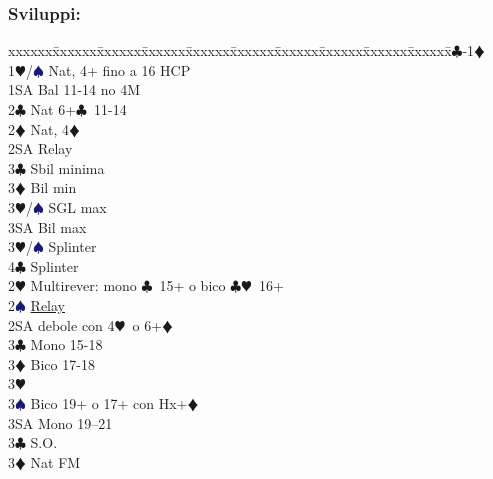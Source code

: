 \documentclass[a4paper,italian]{article}
\newcommand{\BC}{\textcolor{OliveGreen}{$\clubsuit$}}
\newcommand{\BD}{\textcolor{RedOrange}{$\vardiamondsuit$}}
\newcommand{\BH}{\textcolor{Red2}{$\varheartsuit${}}}
\newcommand{\BS}{\textcolor{MidnightBlue}{$\spadesuit${}}}
\newenvironment{bidtable}
{\begin{tabbing}

    xxxxxx\=xxxxxx\=xxxxxx\=xxxxxx\=xxxxxx\=xxxxxx\=xxxxxx\=xxxxxx\=xxxxxx\=xxxxxx\=\kill}
{\end{tabbing} }%
\begin{document}
\begin{multicols}{2}
                                    \subsubsection{Sviluppi:}
                                    \begin{bidtable}
                                        1\BC-1\BD\+\\
                                        1\BH/\BS \> Nat, 4+ fino a 16 HCP\\
                                        1SA \> Bal 11-14 no 4M\\
                                        2\BC \> Nat 6+\BC\ 11-14\\
                                        2\BD \> Nat, 4\BD \+\\
                                        2SA \> Relay\+\\
                                        3\BC \> Sbil minima\\
                                        3\BD \> Bil min\\
                                        3\BH/\BS \> SGL max\\
                                        3SA \> Bil max\-\\
                                        3\BH/\BS \> Splinter\\
                                        4\BC \> Splinter\-\\
                                        2\BH \> Multirever: mono \BC\ 15+ o bico \BC \BH\ 16+\+\\
                                        2\BS \> \hyperref[multirever]{Relay}\\
                                        2SA \> debole con 4\BH\ o 6+\BD \+\\
                                        3\BC \> Mono 15-18\\
                                        3\BD \> Bico 17-18\\
                                        3\BH {}\\
                                        3\BS \> Bico 19+ o 17+ con Hx+\BD\\
                                        3SA \> Mono 19--21\-\\
                                        3\BC \> S.O.\\
                                        3\BD \> Nat FM\\

\end{bidtable}
\end{multicols}
\end{document}
